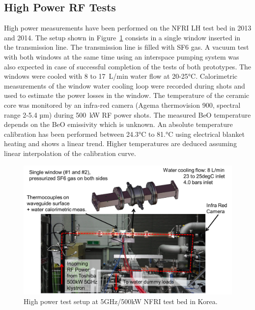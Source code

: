 \subsection{High Power RF Tests}
High power measurements have been performed on the NFRI LH test bed in 2013 and 2014. The setup shown in Figure~\ref{fig:iterwindowsrftests} consists in a single window inserted in the transmission line. The transmission line is filled with SF6 gas. A vacuum test with both windows at the same time using an interspace pumping system was also expected in case of successful completion of the tests of both prototypes. The windows were cooled with 8 to 17~\si{L/min} water flow at 20-25$\si{\degreeCelsius}$. Calorimetric measurements of the window water cooling loop were recorded during shots and used to estimate the power losses in the window. The temperature of the ceramic core was monitored by an infra-red camera (Agema thermovision 900, spectral range 2-5.4 \si{µm}) during 500~kW RF power shots. The measured BeO temperature depends on the BeO emissivity which is unknown. An absolute temperature calibration has been performed between 24.3$\si{\degreeCelsius}$ to 81.$\si{\degreeCelsius}$ using electrical blanket heating and shows a linear trend. Higher temperatures are deduced assuming linear interpolation of the calibration curve. 

\begin{figure}
	\centering
	\includegraphics[width=1.0\linewidth]{figures/chap3/ITER_window/ITER_windows_RF_tests}
	\caption{High power test setup at 5GHz/500kW NFRI test bed in Korea.}
	\label{fig:iterwindowsrftests}
\end{figure}

